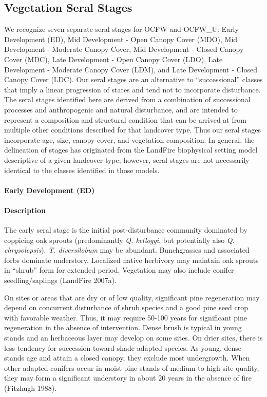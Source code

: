 \subsection*{Vegetation Seral Stages}
We recognize seven separate seral stages for OCFW and OCFW\_U: Early Development (ED), Mid Development - Open Canopy Cover (MDO), Mid Development - Moderate Canopy Cover, Mid Development - Closed Canopy Cover (MDC), Late Development - Open Canopy Cover (LDO), Late Development - Moderate Canopy Cover (LDM), and Late Development - Closed Canopy Cover (LDC). Our seral stages are an alternative to ``successional'' classes that imply a linear progression of states and tend not to incorporate disturbance. The seral stages identified here are derived from a combination of successional processes and anthropogenic and natural disturbance, and are intended to represent a composition and structural condition that can be arrived at from multiple other conditions described for that landcover type. Thus our seral stages incorporate age, size, canopy cover, and vegetation composition. In general, the delineation of stages has originated from the LandFire biophysical setting model descriptive of a given landcover type; however, seral stages are not necessarily identical to the classes identified in those models.

\paragraph{Early Development (ED)} 


\paragraph{Description}
The early seral stage is the initial post-disturbance community dominated by coppicing oak sprouts (predominantly \emph{Q. kelloggi}, but potentially also \emph{Q. chrysolepsis}). \emph{T. diversilobum} may be abundant. Bunchgrasses and associated forbs dominate understory. Localized native herbivory may maintain oak sprouts in ``shrub'' form for extended period. Vegetation may also include conifer seedling/saplings (LandFire 2007a).

On sites or areas that are dry or of low quality, significant pine regeneration may depend on concurrent disturbance of shrub species and a good pine seed crop with favorable weather. Thus, it may require 50-100 years for significant pine regeneration in the absence of intervention. Dense brush is typical in young stands and an herbaceous layer may develop on some sites. On drier sites, there is less tendency for succession toward shade-adapted species. As young, dense stands age and attain a closed canopy, they exclude most undergrowth. When other adapted conifers occur in moist pine stands of medium to high site quality, they may form a significant understory in about 20 years in the absence of fire (Fitzhugh 1988).

